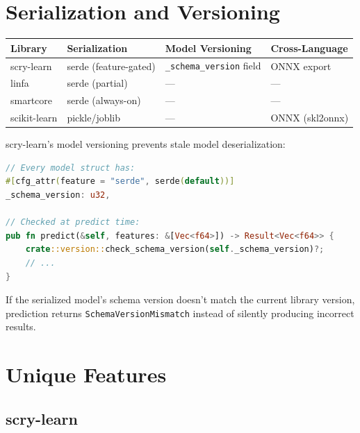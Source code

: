 \documentclass[11pt,a4paper]{article}
\begin{document}
\section{Serialization and Versioning}

\begin{center}
\begin{tabular}{llll}
\toprule
\textbf{Library} & \textbf{Serialization} & \textbf{Model Versioning} & \textbf{Cross-Language} \\
\midrule
scry-learn & serde (feature-gated) & \texttt{\_schema\_version} field & ONNX export \\
linfa & serde (partial) & --- & --- \\
smartcore & serde (always-on) & --- & --- \\
scikit-learn & pickle/joblib & --- & ONNX (skl2onnx) \\
\bottomrule
\end{tabular}
\end{center}

scry-learn's model versioning prevents stale model deserialization:

\begin{lstlisting}[language=Rust]
// Every model struct has:
#[cfg_attr(feature = "serde", serde(default))]
_schema_version: u32,

// Checked at predict time:
pub fn predict(&self, features: &[Vec<f64>]) -> Result<Vec<f64>> {
    crate::version::check_schema_version(self._schema_version)?;
    // ...
}
\end{lstlisting}

If the serialized model's schema version doesn't match the current library version, prediction returns \texttt{SchemaVersionMismatch} instead of silently producing incorrect results.


\section{Unique Features}

\subsection{scry-learn}
\end{document}
